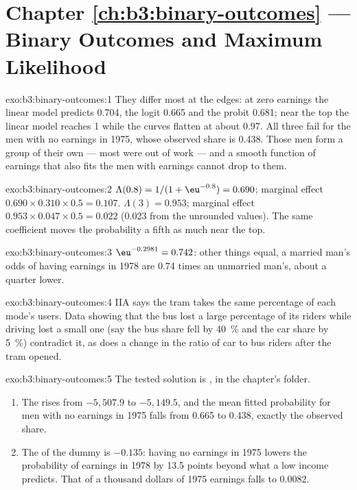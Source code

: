 \section*{Chapter \ref{ch:b3:binary-outcomes} --- Binary Outcomes and Maximum Likelihood}

\begin{solution}{exo:b3:binary-outcomes:1}
They differ most at the edges: at zero earnings the linear model predicts 0.704,
the logit 0.665 and the probit 0.681; near the top the linear model reaches 1
while the curves flatten at about 0.97. %
All three fail for the men with no earnings in 1975, whose observed share is
0.438. %
Those men form a group of their own --- most were out of work --- and a smooth
function of earnings that also fits the men with earnings cannot drop to them.
\end{solution}

\begin{solution}{exo:b3:binary-outcomes:2}
$\Lambda(0.8) = 1/(1 + \eu^{-0.8}) = 0.690$; marginal effect $0.690 \times 0.310
\times 0.5 = 0.107$. $\Lambda(3) = 0.953$; marginal effect $0.953 \times 0.047
\times 0.5 = 0.022$ (0.023 from the unrounded values). The same coefficient moves the probability a fifth as much
near the top.
\end{solution}

\begin{solution}{exo:b3:binary-outcomes:3}
$\eu^{-0.2981} = 0.742$: other things equal, a married man's odds of having
earnings in 1978 are 0.74 times an unmarried man's, about a quarter lower.
\end{solution}

\begin{solution}{exo:b3:binary-outcomes:4}
IIA says the tram takes the same percentage of each mode's users. Data showing
that the bus lost a large percentage of its riders while driving lost a small
one (say the bus share fell by 40~\% and the car share by 5~\%) contradict it, as
does a change in the ratio of car to bus riders after the tram opened.
\end{solution}

\begin{solution}{exo:b3:binary-outcomes:5}
The tested solution is , in the chapter's
 folder.
\begin{enumerate}
\item The  rises from $-5{,}507.9$ to $-5{,}149.5$, and the mean
fitted probability for men with no earnings in 1975 falls from 0.665 to 0.438,
exactly the observed share. %
\item The  of the dummy is $-0.135$: having no earnings in
1975 lowers the probability of earnings in 1978 by 13.5 points beyond what a
low income predicts. That of a thousand dollars of 1975 earnings falls to
0.0082.
\end{enumerate}
\end{solution}

